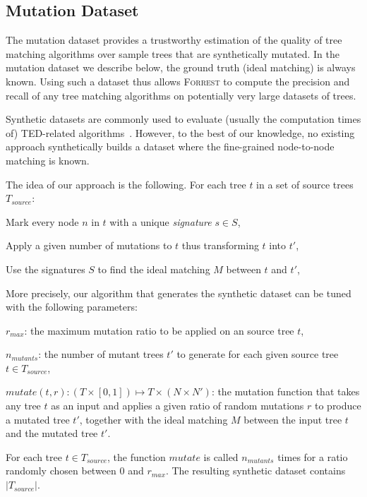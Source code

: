 \documentclass{vldb}
\newcommand{\forrest}[0]{\textsc{Forrest}\xspace}
\begin{document}
\subsection{Mutation Dataset}\label{sec:mutation}
The mutation dataset provides a trustworthy estimation of the quality of tree matching algorithms over sample trees that are synthetically mutated.
In the mutation dataset we describe below, the ground truth (ideal matching) is always known.
Using such a dataset thus allows \forrest{} to compute the precision and recall of any tree matching algorithms on potentially very large datasets of trees.

Synthetic datasets are commonly used to evaluate (usually the computation times of) TED-related algorithms~\cite{XXX}.
However, to the best of our knowledge, no existing approach synthetically builds a dataset where the fine-grained node-to-node matching is known.

The idea of our approach is the following.
For each tree $t$ in a set of source trees $T_{source}$:
\begin{compactenum}
    \item Mark every node $n$ in $t$ with a unique \textit{signature} $s \in S$,
    \item Apply a given number of mutations to $t$ thus transforming $t$ into $t'$,
    \item Use the signatures $S$ to find the ideal matching $M$ between $t$ and $t'$,
\end{compactenum}

More precisely, our algorithm that generates the synthetic dataset can be tuned with the following parameters:
\begin{compactenum}
	\item $r_{max}$: the maximum mutation ratio to be applied on an source tree $t$,
    \item $n_{mutants}$: the number of mutant trees $t'$ to generate for each given source tree $t \in T_{source}$,
    \item  $mutate(t,r):(T\times[0,1])\mapsto T \times (N \times N')$: the mutation function that takes any tree $t$ as an input and applies a given ratio of random mutations $r$ to produce a mutated tree $t'$, together with the ideal matching $M$ between the input tree $t$ and the mutated tree $t'$.
\end{compactenum}
For each tree $t \in T_{source}$, the function $mutate$ is called $n_{mutants}$ times for a ratio randomly chosen between $0$ and $r_{max}$.
The resulting synthetic dataset contains $|T_{source}|$.
\end{document}
